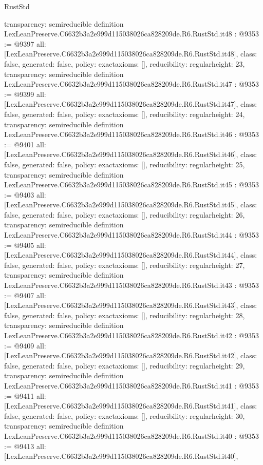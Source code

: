 \begin{lexlean}{RustStd}
\begin{coremodule}
{  transparency: semireducible
}
definition LexLeanPreserve.C6632b3a2e999d115038026ca828209de.R6.RustStd.it48 : @9353 := @9397 {
  all: [LexLeanPreserve.C6632b3a2e999d115038026ca828209de.R6.RustStd.it48],
  class: false,
  generated: false,
  policy: exact{axioms: []},
  reducibility: regular{height: 23},
  transparency: semireducible
}
definition LexLeanPreserve.C6632b3a2e999d115038026ca828209de.R6.RustStd.it47 : @9353 := @9399 {
  all: [LexLeanPreserve.C6632b3a2e999d115038026ca828209de.R6.RustStd.it47],
  class: false,
  generated: false,
  policy: exact{axioms: []},
  reducibility: regular{height: 24},
  transparency: semireducible
}
definition LexLeanPreserve.C6632b3a2e999d115038026ca828209de.R6.RustStd.it46 : @9353 := @9401 {
  all: [LexLeanPreserve.C6632b3a2e999d115038026ca828209de.R6.RustStd.it46],
  class: false,
  generated: false,
  policy: exact{axioms: []},
  reducibility: regular{height: 25},
  transparency: semireducible
}
definition LexLeanPreserve.C6632b3a2e999d115038026ca828209de.R6.RustStd.it45 : @9353 := @9403 {
  all: [LexLeanPreserve.C6632b3a2e999d115038026ca828209de.R6.RustStd.it45],
  class: false,
  generated: false,
  policy: exact{axioms: []},
  reducibility: regular{height: 26},
  transparency: semireducible
}
definition LexLeanPreserve.C6632b3a2e999d115038026ca828209de.R6.RustStd.it44 : @9353 := @9405 {
  all: [LexLeanPreserve.C6632b3a2e999d115038026ca828209de.R6.RustStd.it44],
  class: false,
  generated: false,
  policy: exact{axioms: []},
  reducibility: regular{height: 27},
  transparency: semireducible
}
definition LexLeanPreserve.C6632b3a2e999d115038026ca828209de.R6.RustStd.it43 : @9353 := @9407 {
  all: [LexLeanPreserve.C6632b3a2e999d115038026ca828209de.R6.RustStd.it43],
  class: false,
  generated: false,
  policy: exact{axioms: []},
  reducibility: regular{height: 28},
  transparency: semireducible
}
definition LexLeanPreserve.C6632b3a2e999d115038026ca828209de.R6.RustStd.it42 : @9353 := @9409 {
  all: [LexLeanPreserve.C6632b3a2e999d115038026ca828209de.R6.RustStd.it42],
  class: false,
  generated: false,
  policy: exact{axioms: []},
  reducibility: regular{height: 29},
  transparency: semireducible
}
definition LexLeanPreserve.C6632b3a2e999d115038026ca828209de.R6.RustStd.it41 : @9353 := @9411 {
  all: [LexLeanPreserve.C6632b3a2e999d115038026ca828209de.R6.RustStd.it41],
  class: false,
  generated: false,
  policy: exact{axioms: []},
  reducibility: regular{height: 30},
  transparency: semireducible
}
definition LexLeanPreserve.C6632b3a2e999d115038026ca828209de.R6.RustStd.it40 : @9353 := @9413 {
  all: [LexLeanPreserve.C6632b3a2e999d115038026ca828209de.R6.RustStd.it40],
}
\end{coremodule}
\end{lexlean}
